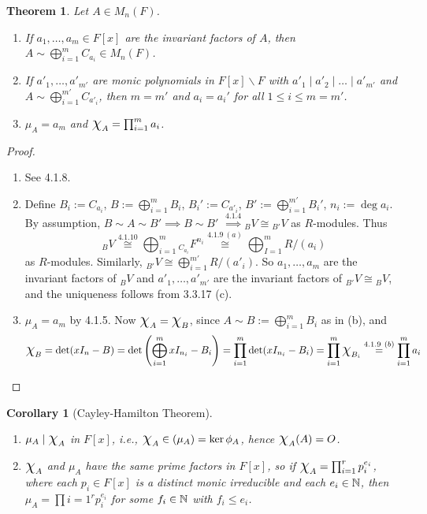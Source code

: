 \documentclass[11pt]{book}
\newcounter{counter}
\newtheorem{theorem}[counter]{Theorem}   \newtheorem*{theorem*}{Theorem}   \newtheorem{lemma}[counter]{Lemma}   \newtheorem{corollary}[counter]{Corollary}
\theoremstyle{definition}   \newtheorem{defn}[counter]{Definition} %
\newcommand{\bs}{\backslash}   \newcommand{\A}{\mathcal{A}}   \newcommand{\sy}{\textnormal{Syl}}   \newcommand{\size}[1]{\left| #1 \right|}
\newcommand{\Chi}{\mbox{\Large $\chi$}}
\newcommand{\vs}{\vspace{8pt}}
\numberwithin{counter}{chapter}
\begin{document}
\vs

\begin{theorem}
Let $A \in M_n(F)$.
\begin{enumerate}
\item[(a)] If $a_1,\dots,a_m \in F[x]$ are the invariant factors of $A$, then $A \sim \bigoplus_{i=1}^m C_{a_i} \in M_n(F)$.
\item[(b)] If $a'_1,\dots,a'_{m'}$ are monic polynomials in $F[x]\bs F$ with $a'_1\mid a'_2 \mid \dots \mid a'_{m'}$ and $A \sim \bigoplus_{i=1}^{m'} C_{a'_i}$, then $m = m'$ and $a_i = a_i'$ for all $1 \leq i \leq m = m'$.
\item[(c)] $\mu_A = a_m$ and $\Chi_A = \prod_{i=1}^m a_i$.
\end{enumerate}
\end{theorem}

\begin{proof}\
\begin{enumerate}
\item[(a)] See 4.1.8.
\item[(b)] Define $B_i := C_{a_i}$, $B := \bigoplus_{i=1}^m B_i$, $B_i' := C_{a'_i}$, $B' := \bigoplus_{i=1}^{m'} B_i'$, $n_i := \deg a_i$. By assumption, $B \sim A \sim B' \implies B \sim B'$ $\overset{4.1.4}{\implies} {_BV} \cong {_{B'}V}$ as $R$-modules. Thus
	\[{_BV} \overset{4.1.10}{\cong} \bigoplus_{i=1}^m {_{C_{a_i}}}F^{n_i} \overset{4.1.9 \ (a)}{\cong} \bigoplus_{I=1}^m R/(a_i) \]
as $R$-modules. Similarly, ${_{B'}V} \cong \bigoplus_{i=1}^{m'} R/(a'_i)$. So $a_1,\dots,a_m$ are the invariant factors of ${_BV}$ and $a'_1,\dots,a'_{m'}$ are the invariant factors of ${_{B'}V} \cong {_BV}$, and the uniqueness follows from 3.3.17 (c).

\item[(c)] $\mu_A = a_m$ by 4.1.5. Now $\Chi_A = \Chi_B$, since $A \sim B := \bigoplus_{i=1}^m B_i$ as in (b), and
	\[\Chi_B = \det(xI_n-B) = \det \left(\bigoplus_{i=1}^m xI_{n_i} - B_i\right) = \prod_{i=1}^m \det(xI_{n_i} - B_i) = \prod_{i=1}^m \Chi_{B_i} \overset{4.1.9\ (b)}{=} \prod_{i=1}^m a_i \]
\end{enumerate}
\end{proof}

\vs

\begin{corollary}[Cayley-Hamilton Theorem]\
\begin{enumerate}
\item[(a)] $\mu_A \mid \Chi_A$ in $F[x]$, i.e., $\Chi_A \in (\mu_A) = \ker \phi_A$, hence $\Chi_A(A) = O$.
\item[(b)] $\Chi_A$ and $\mu_A$ have the same prime factors in $F[x]$, so if $\Chi_A = \prod_{i=1}^r p_i^{e_i}$, where each $p_i \in F[x]$ is a distinct monic irreducible and each $e_i \in \operatorname{\mathbb{N}}$, then $\mu_A = \prod{i=1}^r p_i^{e_i}$ for some $f_i \in \operatorname{\mathbb{N}}$ with $f_i \leq e_i$.
\end{enumerate}
\end{corollary}
\end{document}
